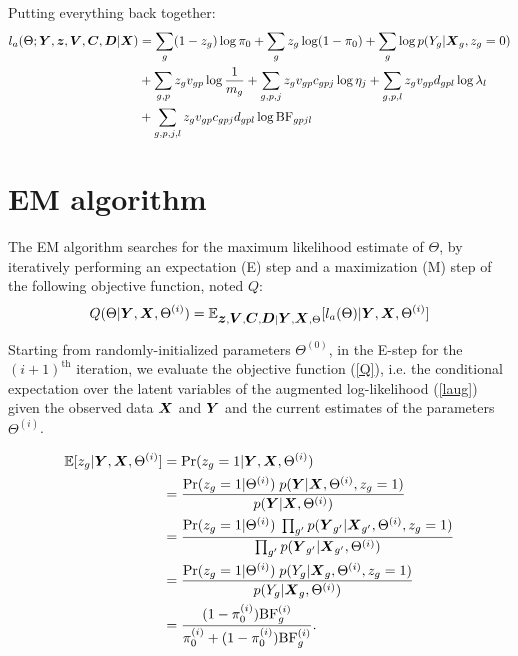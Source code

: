 \documentclass[10pt]{article}
\newcommand{\Prob}{\Pr} %
\newcommand{\Exp}{\mathbb{E}} %
\newcommand{\BF}{{\text{BF}}} %
\newcommand{\Cv}{\mbox{\boldmath$C$}}
\newcommand{\Dv}{\mbox{\boldmath$D$}}
\newcommand{\Xv}{\mbox{\boldmath$X$}}
\newcommand{\Vv}{\mbox{\boldmath$V$}}
\newcommand{\Yv}{\mbox{\boldmath$Y$}}
\newcommand{\zv}{\mbox{\boldmath$z$}}
\begin{document}
Putting everything back together:
\begin{equation}
 \label{laug}  
  \begin{aligned}
    l_a(\Theta;\Yv,\zv,\Vv,\Cv,\Dv|\Xv) &= \sum_g (1-z_g)\log \pi_0 + \sum_g z_g \log (1-\pi_0) + \sum_g \log p(Y_g|\Xv_g,z_g=0) \\
    &+ \sum_{g,p} z_gv_{gp} \log \frac{1}{m_g} + \sum_{g,p,j}z_g v_{gp} c_{gpj} \log \eta_j + \sum_{g,p,l} z_g v_{gp} d_{gpl} \log \lambda_l  \\
    &+ \sum_{g,p,j,l} z_g v_{gp} c_{gpj} d_{gpl} \log \BF_{gpjl}
  \end{aligned}
\end{equation}



\section{EM algorithm}

The EM algorithm searches for the maximum likelihood estimate of $\Theta$, by iteratively performing an expectation (E) step and a maximization (M) step of the following objective function, noted $Q$:
\begin{equation}
  \label{Q}
  \begin{aligned}
    Q(\Theta|\Yv,\Xv,\Theta^{(i)}) = \Exp_{\zv,\Vv,\Cv,\Dv|\Yv,\Xv,\Theta} [ l_a(\Theta) | \Yv,\Xv,\Theta^{(i)} ]
  \end{aligned}
\end{equation}

Starting from randomly-initialized parameters $\Theta^{(0)}$, in the E-step for the $(i+1)^{\text{th}}$ iteration, we evaluate the objective function (\ref{Q}), i.e. the conditional expectation over the latent variables of the augmented log-likelihood (\ref{laug}) given the observed data $\Xv$ and $\Yv$ and the current estimates of the parameters $\Theta^{(i)}$.

\begin{equation}
  \begin{aligned}
    \Exp[z_g | \Yv, \Xv, \Theta^{(i)}] &= \Prob(z_g=1 | \Yv, \Xv,\Theta^{(i)}) \\ 
    &= \frac{\Prob(z_g=1 | \Theta^{(i)}) \; p(\Yv | \Xv, \Theta^{(i)}, z_g=1)}{p(\Yv | \Xv, \Theta^{(i)})} \\
    &= \frac{\Prob(z_g=1 | \Theta^{(i)}) \; \prod_{g'} p(\Yv_{g'} | \Xv_{g'}, \Theta^{(i)}, z_g=1)}{\prod_{g'} p(\Yv_{g'} | \Xv_{g'}, \Theta^{(i)})} \\
    &= \frac{\Prob(z_g=1 | \Theta^{(i)}) \; p(Y_g | \Xv_g, \Theta^{(i)}, z_g=1)}{p(Y_g | \Xv_g, \Theta^{(i)})} \\
    &= \frac{(1-\pi_0^{(i)}) \BF^{(i)}_{g}}{\pi_0^{(i)} + (1-\pi_0^{(i)}) \BF^{(i)}_{g}}.
  \end{aligned}
\end{equation}
\end{document}
